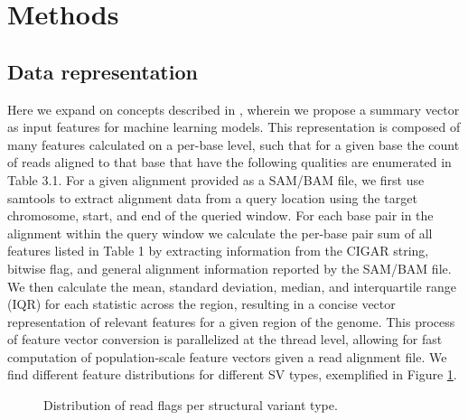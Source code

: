 \section{Methods}

\subsection{Data representation}

Here we expand on concepts described in \cite{hillDeepLearningApproach2019}, wherein we propose a summary vector as input features for machine learning models. This representation is composed of many features calculated on a per-base level, such that for a given base the count of reads aligned to that base that have the following qualities are enumerated in Table 3.1. For a given alignment provided as a SAM/BAM file, we first use samtools \cite{danecekTwelveYearsSAMtools2021} to extract alignment data from a query location using the target chromosome, start, and end of the queried window. For each base pair in the alignment within the query window we calculate the per-base pair sum of all features listed in Table 1 by extracting information from the CIGAR string, bitwise flag, and general alignment information reported by the SAM/BAM file. We then calculate the mean, standard deviation, median, and interquartile range (IQR) for each statistic across the region, resulting in a concise vector representation of relevant features for a given region of the genome. This process of feature vector conversion is parallelized at the thread level, allowing for fast computation of population-scale feature vectors given a read alignment file. We find different feature distributions for different SV types, exemplified in Figure \ref{fig:read-dists}.

\begin{figure}
    \centering
    \caption[Distribution of read flags per structural variant type.]{Distribution of read flags per structural variant type.}
    \label{fig:read-dists}
\end{figure}

